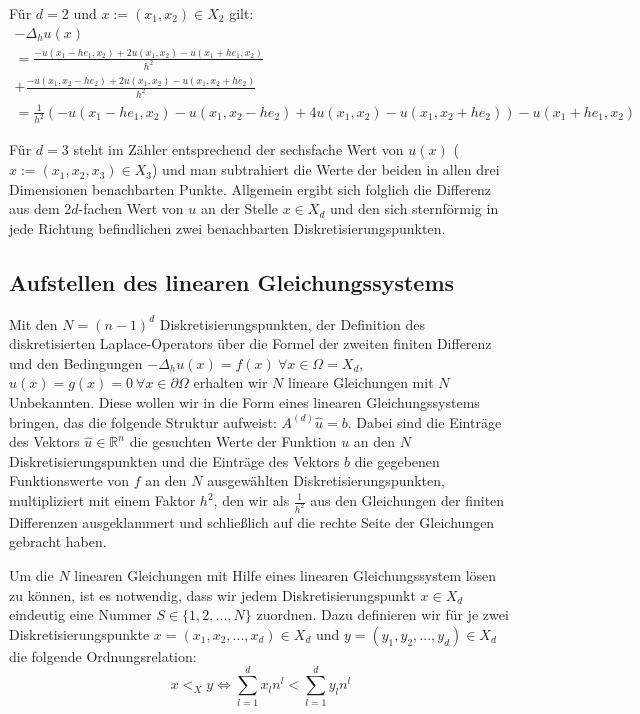 \documentclass{scrartcl}
\newcommand{\R}{\mathbb{R}}
\begin{document}
Für $d=2$ und $x:=(x_1,x_2)\in X_2$ gilt:
\begin{align*}
-\Delta_h u(x) \\
= \frac{-u(x_1-he_1,x_2)+2u(x_1,x_2)-u(x_1+he_1,x_2)}{h^2}\ \\
+ \frac{-u(x_1,x_2-he_2)+2u(x_1,x_2)-u(x_1,x_2+he_2)}{h^2} \\
= \frac{1}{h^2} (-u(x_1-he_1,x_2)-u(x_1,x_2-he_2)+4u(x_1,x_2)-u(x_1,x_2+he_2))-u(x_1+he_1,x_2)
\end{align*}

Für $d=3$ steht im Zähler entsprechend der sechsfache Wert von $u(x)$ ($x:=(x_1,x_2, x_3)\in X_3$) und man subtrahiert die Werte der beiden in allen drei Dimensionen benachbarten Punkte. Allgemein ergibt sich folglich die Differenz aus dem $2d$-fachen Wert von $u$ an der Stelle $x \in X_d$ und den sich sternförmig in jede Richtung befindlichen zwei benachbarten Diskretisierungspunkten.

\subsection{Aufstellen des linearen Gleichungssystems}
Mit den $N=(n-1)^d$ Diskretisierungspunkten, der Definition des diskretisierten Laplace-Operators über die Formel der zweiten finiten Differenz und den Bedingungen
$-\Delta_h u(x) = f(x) \: \forall x \in \Omega = X_d$,
$u(x) = g(x) = 0 \: \forall x \in \partial\Omega$
erhalten wir $N$ lineare Gleichungen mit $N$ Unbekannten.
Diese wollen wir in die Form eines linearen Gleichungssystems bringen, das die folgende Struktur aufweist: $A^{(d)}\hat{u}=b$.
Dabei sind die Einträge des Vektors $\hat{u}\in\R^n$ die gesuchten Werte der Funktion $u$ an den $N$ Diskretisierungspunkten und die Einträge des Vektors $b$ die gegebenen Funktionswerte von $f$ an den $N$ ausgewählten Diskretisierungspunkten, multipliziert mit einem Faktor $h^2$, den wir als $\frac{1}{h^2}$ aus den Gleichungen der finiten Differenzen ausgeklammert und schließlich auf die rechte Seite der Gleichungen gebracht haben.

Um die $N$ linearen Gleichungen mit Hilfe eines linearen Gleichungssystem lösen zu können, ist es notwendig, dass wir jedem Diskretisierungspunkt $x \in X_d$ eindeutig eine Nummer $S \in \lbrace1, 2, ..., N\rbrace$ zuordnen. Dazu definieren wir für je zwei Diskretisierungspunkte $x=(x_1, x_2, ..., x_d) \in X_d$ und $y=(y_1, y_2, ..., y_d) \in X_d$ die folgende Ordnungsrelation:
\[x <_X y \iff \sum_{l=1}^d x_l n^l < \sum_{l=1}^d y_l n^l\]
\end{document}
